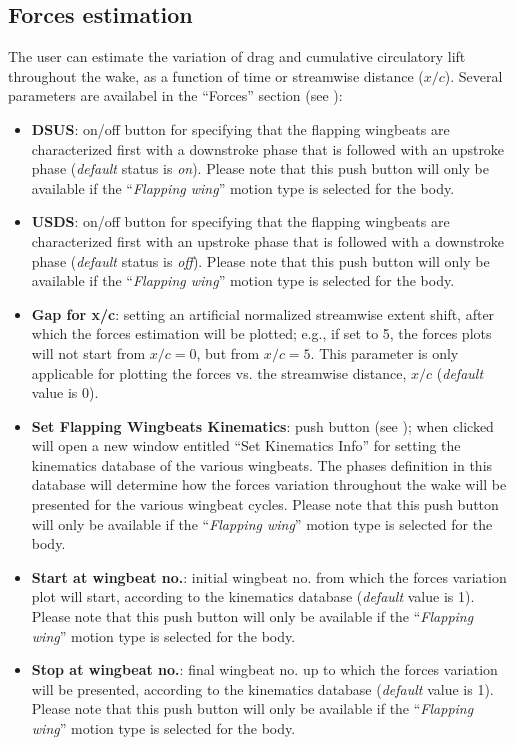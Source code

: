 \documentclass[12pt,a4paper]{article}
\begin{document}
\subsection{Forces estimation}\label{forces_estimation}
The user can estimate the variation of drag and cumulative circulatory lift throughout the wake, as a function of time or streamwise distance ($x/c$). 
Several parameters are availabel in the ``Forces'' section (see ):
\begin{itemize}
	\item \textbf{DSUS}: on/off button for specifying that the flapping wingbeats are characterized first with a downstroke phase that is followed with an upstroke phase (\textit{default} status is \textit{on}). Please note that this push button will only be available if the ``\textit{Flapping wing}'' motion type is selected for the body.
	\item \textbf{USDS}: on/off button for specifying that the flapping wingbeats are characterized first with an upstroke phase that is followed with a downstroke phase (\textit{default} status is \textit{off}). Please note that this push button will only be available if the ``\textit{Flapping wing}'' motion type is selected for the body.
	\item \textbf{Gap for x/c}: setting an artificial normalized streamwise extent shift, after which the forces estimation will be plotted; e.g., if set to 5, the forces plots will not start from $x/c=0$, but from $x/c=5$. This parameter is only applicable for plotting the forces vs. the streamwise distance, $x/c$ (\textit{default} value is 0).
	\item \textbf{Set Flapping Wingbeats Kinematics}: push button (see ); when clicked will open a new window entitled ``Set Kinematics Info'' for setting the kinematics database of the various wingbeats. The phases definition in this database will determine how the forces variation throughout the wake will be presented for the various wingbeat cycles. Please note that this push button will only be available if the ``\textit{Flapping wing}'' motion type is selected for the body.
	\item \textbf{Start at wingbeat no.}: initial wingbeat no. from which the forces variation plot will start, according to the kinematics database (\textit{default} value is 1). Please note that this push button will only be available if the ``\textit{Flapping wing}'' motion type is selected for the body.
	\item \textbf{Stop at wingbeat no.}: final wingbeat no. up to which the forces variation will be presented, according to the kinematics database (\textit{default} value is 1). Please note that this push button will only be available if the ``\textit{Flapping wing}'' motion type is selected for the body.

\end{itemize}
\end{document}
